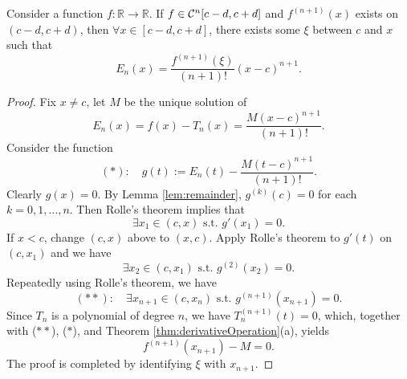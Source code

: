  \begin{thm}
   \label{thm:TaylorLagrangianForm}
   Consider a function
    $f: \mathbb{R} \rightarrow \mathbb{R}$.
   If $f\in {\cal C}^n[c-d,c+d]$
    and $f^{(n+1)}(x)$ exists on $(c-d, c+d)$,
   then
    $\forall x\in [c-d,c+d]$,
    there exists some $\xi$ between $c$ and $x$
    such that
    \begin{equation}
      \label{eq:TaylorTheorem}
      E_n(x) = \frac{f^{(n+1)}(\xi)}{(n+1)!}(x-c)^{n+1}.
    \end{equation}
 \end{thm}
 \begin{proof}
   Fix $x\ne c$,
    let $M$ be the unique solution of 
   \begin{equation*}
     E_n(x) = f(x) - T_n(x) = \frac{M(x-c)^{n+1}}{(n+1)!}.
   \end{equation*}
   Consider the function
   \begin{displaymath}
     (*):\quad
      g(t) := E_n(t) - \frac{M(t-c)^{n+1}}{(n+1)!}.
   \end{displaymath}
   Clearly $g(x)=0$.
   By Lemma \ref{lem:remainder},
    $g^{(k)}(c)=0$ for each $k= 0,1,\ldots,n$.
   Then Rolle's theorem implies that
   \begin{equation*}
    \exists x_1\in (c, x) \text{ s.t. } g'(x_1)=0. 
   \end{equation*}
   If $x<c$, change $(c,x)$ above to $(x,c)$.
   Apply Rolle's theorem to $g'(t)$ on $(c,x_1)$
   and we have
   \begin{equation*}
    \exists x_2\in (c, x_1) \text{ s.t. } g^{(2)}(x_2)=0. 
   \end{equation*}
   Repeatedly using Rolle's theorem, we have
   \begin{displaymath}
     (**):\quad
     \exists x_{n+1}\in (c, x_n) \text{ s.t. } g^{(n+1)}(x_{n+1})=0.
   \end{displaymath}
  Since $T_n$ is a polynomial of degree $n$,
   we have $T_n^{(n+1)}(t)=0$, 
   which, together with ($**$),  ($*$),
   and Theorem \ref{thm:derivativeOperation}(a), 
   yields 
   \begin{equation*}
     f^{(n+1)}(x_{n+1})-M=0.
   \end{equation*}
   The proof is completed
    by identifying $\xi$ with $x_{n+1}$.
\end{proof}

